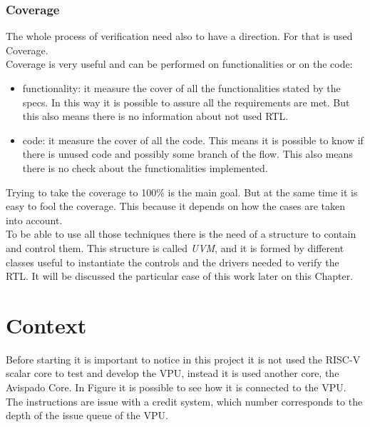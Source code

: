 \bigskip

\subsubsection{Coverage}
The whole process of verification need also to have a direction. For that is used Coverage. \\

Coverage is very useful and can be performed on functionalities or on the code:
\begin{itemize}
    \item functionality: it measure the cover of all the functionalities stated by the specs. In this way it is possible to assure all the requirements are met. But this also means there is no information about not used RTL.
    
    \item code: it measure the cover of all the code. This means it is possible to know if there is unused code and possibly some branch of the flow. This also means there is no check about the functionalities implemented.

\end{itemize}

Trying to take the coverage to 100\% is the main goal. But at the same time it is easy to fool the coverage. This because it depends on how the cases are taken into account. \\

To be able to use all those techniques there is the need of a structure to contain and control them.
This structure is called \textit{UVM}, and it is formed by different classes useful to instantiate the controls and the drivers needed to verify the RTL. It will be discussed the particular case of this work later on this Chapter.

\section{Context}
Before starting it is important to notice in this project it is not used the RISC-V scalar core to test and develop the VPU, instead it is used another core, the Avispado Core.
In Figure %
it is possible to see how it is connected to the VPU.\\

The instructions are issue with a credit system, which number corresponds to the  depth of the issue queue of the VPU.\\

